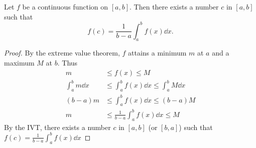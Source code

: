 
\begin{thm} \label{thm:mvt int}
    Let $f$ be a continuous function on $[a,b]$.  Then there exists a
    number $c$ in $[a,b]$ such that \[
        f(c) = \frac{1}{b - a} \int_{a}^{b} f(x) \dd x.
    \]
\end{thm}
\begin{proof}
    By the extreme value theorem, $f$ attains a minimum $m$ at $a$ and a maximum $M$ at $b$. Thus
    \begin{align*}
        m &\leq f(x) \leq M \\
        \int_{a}^{b} m \dd x &\leq \int_{a}^{b} f(x) \dd x \leq \int_{a}^{b} M \dd x \\
        (b - a) m &\leq \int_{a}^{b} f(x) \dd x \leq (b - a) M \\
        m &\leq \frac{1}{b - a} \int_{a}^{b} f(x) \dd x \leq M
    \end{align*}
    By the IVT, there exists a number $c$ in $[a,b]$ (or $[b, a]$) such that $f(c) = \frac{1}{b - a} \int_{a}^{b} f(x) \dd x$
\end{proof}

